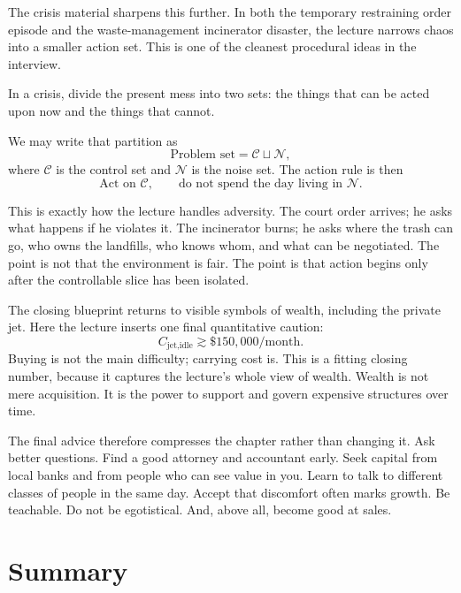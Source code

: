 The crisis material sharpens this further. In both the temporary restraining order episode and the waste-management incinerator disaster, the lecture narrows chaos into a smaller action set. This is one of the cleanest procedural ideas in the interview.

\begin{definition}
In a crisis, divide the present mess into two sets: the things that can be acted upon now and the things that cannot.
\end{definition}

We may write that partition as
\begin{equation}
\text{Problem set} = \mathcal{C} \sqcup \mathcal{N},
\end{equation}
where \(\mathcal{C}\) is the control set and \(\mathcal{N}\) is the noise set. The action rule is then
\begin{equation}
\text{Act on } \mathcal{C}, \qquad \text{do not spend the day living in } \mathcal{N}.
\end{equation}

This is exactly how the lecture handles adversity. The court order arrives; he asks what happens if he violates it. The incinerator burns; he asks where the trash can go, who owns the landfills, who knows whom, and what can be negotiated. The point is not that the environment is fair. The point is that action begins only after the controllable slice has been isolated.

The closing blueprint returns to visible symbols of wealth, including the private jet. Here the lecture inserts one final quantitative caution:
\begin{equation}
C_{\text{jet,idle}} \gtrsim \$150{,}000/\text{month}.
\end{equation}
Buying is not the main difficulty; carrying cost is. This is a fitting closing number, because it captures the lecture's whole view of wealth. Wealth is not mere acquisition. It is the power to support and govern expensive structures over time.

The final advice therefore compresses the chapter rather than changing it. Ask better questions. Find a good attorney and accountant early. Seek capital from local banks and from people who can see value in you. Learn to talk to different classes of people in the same day. Accept that discomfort often marks growth. Be teachable. Do not be egotistical. And, above all, become good at sales.

\section{Summary}

